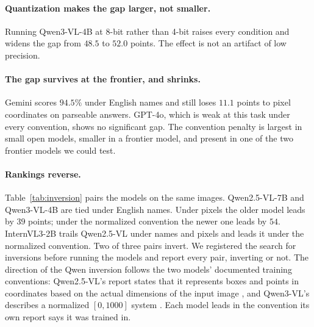 \documentclass{article}
\begin{document}
\paragraph{Quantization makes the gap larger, not smaller.} Running Qwen3-VL-4B at
8-bit rather than 4-bit raises every condition and widens the gap from $48.5$ to
$52.0$ points. The effect is not an artifact of low precision.

\paragraph{The gap survives at the frontier, and shrinks.} Gemini scores $94.5\%$
under English names and still loses $11.1$ points to pixel coordinates on
parseable answers. GPT-4o, which is weak at this task under every convention,
shows no significant gap. The convention penalty is largest in small open models,
smaller in a frontier model, and present in one of the two frontier models we
could test.

\paragraph{Rankings reverse.} Table~\ref{tab:inversion} pairs the models on the
same images. Qwen2.5-VL-7B and Qwen3-VL-4B are tied under English names. Under
pixels the older model leads by $39$ points; under the normalized convention the
newer one leads by $54$. InternVL3-2B trails Qwen2.5-VL under names and pixels
and leads it under the normalized convention. Two of three pairs invert. We
registered the search for inversions before running the models and report every
pair, inverting or not. The direction of the Qwen inversion follows the two
models' documented training conventions: Qwen2.5-VL's report states that it
represents boxes and points in coordinates based on the actual dimensions of the
input image \citep{qwen25vl2025}, and Qwen3-VL's describes a normalized
$[0,1000]$ system \citep{qwen3vl2025}. Each model leads in the convention its
own report says it was trained in.
\end{document}
